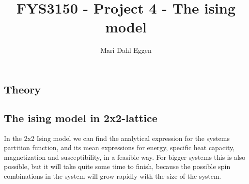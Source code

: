 \documentclass[12pt]{article}
\begin{document}
\title{FYS3150 - Project 4 - The ising model}
\author{Mari Dahl Eggen}
\maketitle

\newpage

\begin{flushleft}
\section{Theory}
\subsection{The ising model in 2x2-lattice}
In the 2x2 Ising model  we can find the analytical expression for the systems partition function, and its mean expressions for energy, specific heat capacity, magnetization and susceptibility, in a feasible way. For bigger systems this is also possible, but it will take quite some time to finish, because the possible spin combinations in the system will grow rapidly with the size of the system.  

\end{flushleft}
\end{document}
